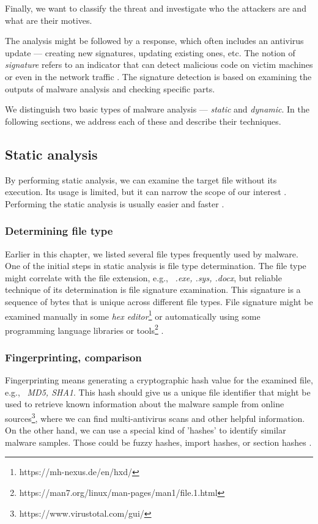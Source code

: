 Finally, we want to classify the threat and investigate who the attackers are and what are their motives.

The analysis might be followed by a response, which often includes an antivirus update --- creating new signatures, updating existing ones, etc. The notion of \emph{signature} refers to an indicator that can detect malicious code on victim machines or even in the network traffic \cite{Sikorski2012}. The signature detection is based on examining the outputs of malware analysis and checking specific parts.

We distinguish two basic types of malware analysis --- \emph{static} and \emph{dynamic}. In the following sections, we address each of these and describe their techniques.

\subsection{Static analysis}
By performing static analysis, we can examine the target file without its execution. Its usage is limited, but it can narrow the scope of our interest \cite{KA2018}. Performing the static analysis is usually easier and faster \cite{Sikorski2012}.

\subsubsection*{Determining file type}
Earlier in this chapter, we listed several file types frequently used by malware. One of the initial steps in static analysis is file type determination. The file type might correlate with the file extension, e.g., \ \emph{.exe, .sys, .docx}, but reliable technique of its determination is file signature examination. This signature is a sequence of bytes that is unique across different file types. File signature might be examined manually in some \emph{hex editor}\footnote{https://mh-nexus.de/en/hxd/} or automatically using some programming language libraries or tools\footnote{https://man7.org/linux/man-pages/man1/file.1.html} \cite{KA2018}.


\subsubsection*{Fingerprinting, comparison}
Fingerprinting means generating a cryptographic hash value for the examined file, e.g., \ \emph{MD5, SHA1}. This hash should give us a unique file identifier that might be used to retrieve known information about the malware sample from online sources\footnote{https://www.virustotal.com/gui/}, where we can find multi-antivirus scans and other helpful information. On the other hand, we can use a special kind of 'hashes' to identify similar malware samples. Those could be fuzzy hashes, import hashes, or section hashes \cite{KA2018}.

